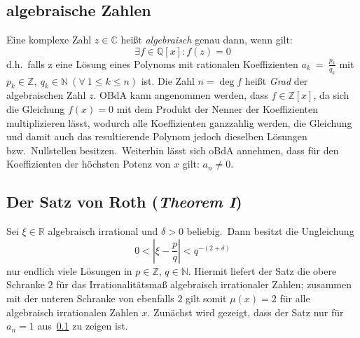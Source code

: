 
\subsection{algebraische Zahlen}
    \label{subsec:algebraic-numbers}
    \textrm{Eine komplexe Zahl $z \in \mathbb{C}$ heißt \emph{algebraisch} genau dann, wenn gilt:}
    \begin{equation}
        \exists f \in \mathbb{Q}[x] : f(z) = 0 \label{eq:def-algebraic}
    \end{equation}
    \textrm{d.h.\ falls z eine Lösung eines Polynoms mit rationalen Koeffizienten $a_k~=~\frac{p_k}{q_k}$ mit $p_k \in
    \mathbb{Z},\ q_k \in \mathbb{N}\ (\forall \ 1 \leq k \leq n)$ ist.
    \newline
    Die Zahl $n = \deg f$ heißt \emph{Grad} der algebraischen Zahl $z$.
    \newline
    OBdA kann angenommen werden, dass $f \in \mathbb{Z}[x]$, da sich die Gleichung $f(x) = 0$ mit dem Produkt der Nenner
    der Koeffizienten multiplizieren lässt, wodurch alle Koeffizienten ganzzahlig werden, die Gleichung und damit auch
    das resultierende Polynom jedoch dieselben Lösungen bzw.\ Nullstellen besitzen.\ Weiterhin lässt sich oBdA annehmen,
    dass für den Koeffizienten der höchsten Potenz von $x$ gilt: $a_n \neq 0$.}

\subsection{Der Satz von Roth (\emph{Theorem I})}
    \label{subsec:th1}
    Sei $\xi \in \mathbb{R}$ algebraisch irrational und $\delta > 0$ beliebig.\ Dann besitzt die Ungleichung
    \begin{equation}
        0 < \left| \xi - \frac{p}{q} \right| < q^{-(2+\delta)} \label{eq:svr}
    \end{equation}
    \textrm{nur endlich viele Lösungen in $p \in \mathbb{Z}$, $q \in \mathbb{N}$.
    \newpage
    \textrm{Hiermit liefert der Satz die obere Schranke $2$ für das Irrationalitätsmaß algebraisch irrationaler Zahlen;
    zusammen mit der unteren Schranke von ebenfalls $2$ gilt somit $\mu(x) = 2$ für alle algebraisch irrationalen Zahlen
    $x$.}
    \newline \newline
    Zunächst wird gezeigt, dass der Satz nur für $a_n = 1$ aus~\ref{subsec:algebraic-numbers} zu zeigen ist.}

